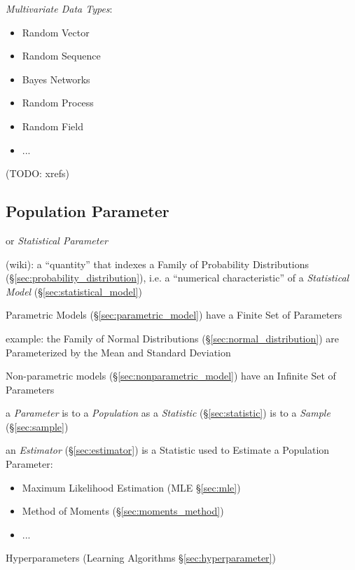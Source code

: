 \emph{Multivariate Data Types}:
\begin{itemize}
  \item Random Vector
  \item Random Sequence
  \item Bayes Networks
  \item Random Process
  \item Random Field
  \item ...
\end{itemize}

(TODO: xrefs)



\subsection{Population Parameter}\label{sec:population_parameter}

or \emph{Statistical Parameter}

(wiki): a ``quantity'' that indexes a Family of Probability Distributions
(\S\ref{sec:probability_distribution}), i.e. a ``numerical characteristic'' of a
\emph{Statistical Model} (\S\ref{sec:statistical_model})

Parametric Models (\S\ref{sec:parametric_model}) have a Finite Set of Parameters

example: the Family of Normal Distributions (\S\ref{sec:normal_distribution})
are Parameterized by the Mean and Standard Deviation

Non-parametric models (\S\ref{sec:nonparametric_model}) have an Infinite Set of
Parameters

a \emph{Parameter} is to a \emph{Population} as a \emph{Statistic}
(\S\ref{sec:statistic}) is to a \emph{Sample} (\S\ref{sec:sample})

\fist an \emph{Estimator} (\S\ref{sec:estimator}) is a Statistic used to
Estimate a Population Parameter:
\begin{itemize}
  \item Maximum Likelihood Estimation (MLE \S\ref{sec:mle})
  \item Method of Moments (\S\ref{sec:moments_method})
  \item ...
\end{itemize}

\fist Hyperparameters (Learning Algorithms \S\ref{sec:hyperparameter})

